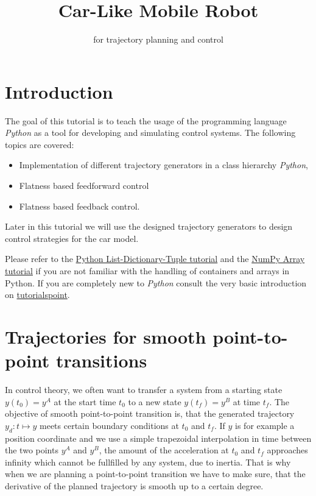 \documentclass[a4paper,11pt,headings=standardclasses,parskip=half]{scrartcl}
\title{Car-Like Mobile Robot}
\subtitle{\py for trajectory planning and control}%
\author{}
\date{}
\newcommand{\py}{\emph{Python}\xspace}
\begin{document}
\maketitle%

\tableofcontents

\newpage

\section{Introduction}
The goal of this tutorial is to teach the usage of the programming language \py as a tool for developing and simulating control systems. The following topics are covered:
\begin{itemize}
\item Implementation of different trajectory generators in a class hierarchy \py,
\item Flatness based feedforward control
\item Flatness based feedback control.

\end{itemize}

Later in this tutorial we will use the designed trajectory generators to design control strategies for the car model. 

Please refer to the \href{http://cs231n.github.io/python-numpy-tutorial/#python-containers}{Python List-Dictionary-Tuple tutorial} and the \href{http://cs231n.github.io/python-numpy-tutorial/#numpy}{NumPy Array tutorial} if you are not familiar with the handling of containers and arrays in Python. If you are completely new to \py consult the very basic introduction on \href{https://www.tutorialspoint.com/python/index.htm}{tutorialspoint}.
\section{Trajectories for smooth point-to-point transitions}
In control theory, we often want to transfer a system from a starting state $y(t_0)=y^A$ at the start time $t_0$ to a new state $y(t_f)=y^B$ at time $t_f$. The objective of smooth point-to-point transition is, that the generated trajectory $y_d: t \mapsto y$ meets certain boundary conditions at $t_0$ and $t_f$. If $y$ is for example a position coordinate and we use a simple trapezoidal interpolation in time between the two points $y^A$ and $y^B$, the amount of the acceleration at $t_0$ and $t_f$ approaches infinity which cannot be fullfilled by any system, due to inertia. That is why when we are planning a point-to-point transition we have to make sure, that the derivative of the planned trajectory is smooth up to a certain degree. 
\end{document}

